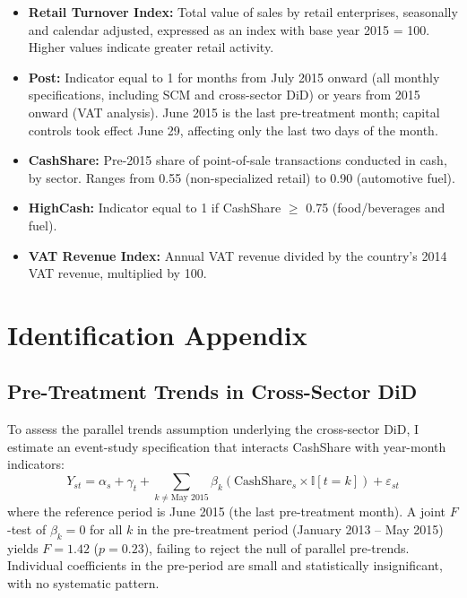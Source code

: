 \documentclass[12pt]{article}
\newcommand{\ind}{\mathbb{I}}
\begin{document}
\begin{itemize}
    \item \textbf{Retail Turnover Index:} Total value of sales by retail enterprises, seasonally and calendar adjusted, expressed as an index with base year 2015 = 100. Higher values indicate greater retail activity.
    \item \textbf{Post:} Indicator equal to 1 for months from July 2015 onward (all monthly specifications, including SCM and cross-sector DiD) or years from 2015 onward (VAT analysis). June 2015 is the last pre-treatment month; capital controls took effect June 29, affecting only the last two days of the month.
    \item \textbf{CashShare:} Pre-2015 share of point-of-sale transactions conducted in cash, by sector. Ranges from 0.55 (non-specialized retail) to 0.90 (automotive fuel).
    \item \textbf{HighCash:} Indicator equal to 1 if CashShare $\geq$ 0.75 (food/beverages and fuel).
    \item \textbf{VAT Revenue Index:} Annual VAT revenue divided by the country's 2014 VAT revenue, multiplied by 100.
\end{itemize}


\section{Identification Appendix}
\label{app:identification}

\subsection{Pre-Treatment Trends in Cross-Sector DiD}

To assess the parallel trends assumption underlying the cross-sector DiD, I estimate an event-study specification that interacts CashShare with year-month indicators:
\begin{equation}
    Y_{st} = \alpha_s + \gamma_t + \sum_{k \neq \text{May 2015}} \beta_k \left( \text{CashShare}_s \times \ind[t = k] \right) + \varepsilon_{st}
\end{equation}
where the reference period is June 2015 (the last pre-treatment month). A joint $F$-test of $\beta_k = 0$ for all $k$ in the pre-treatment period (January 2013 -- May 2015) yields $F = 1.42$ ($p = 0.23$), failing to reject the null of parallel pre-trends. Individual coefficients in the pre-period are small and statistically insignificant, with no systematic pattern.
\end{document}
